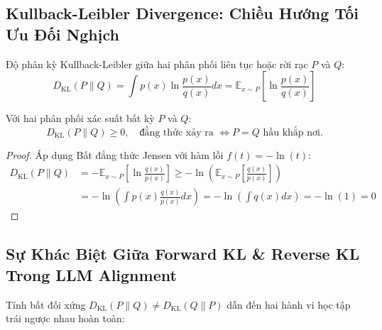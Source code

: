 \subsection{Kullback-Leibler Divergence: Chiều Hướng Tối Ưu Đối Nghịch}

Độ phân kỳ Kullback-Leibler giữa hai phân phối liên tục hoặc rời rạc $P$ và $Q$:
\begin{equation}
D_{\text{KL}}(P \parallel Q) = \int p(x) \ln \frac{p(x)}{q(x)} dx = \mathbb{E}_{x \sim P}\left[ \ln \frac{p(x)}{q(x)} \right]
\end{equation}

\begin{theorem}
Với hai phân phối xác suất bất kỳ $P$ và $Q$:
\begin{equation}
D_{\text{KL}}(P \parallel Q) \ge 0, \quad \text{đẳng thức xảy ra } \iff P = Q \text{ hầu khắp nơi.}
\end{equation}
\end{theorem}

\begin{proof}
Áp dụng Bất đẳng thức Jensen với hàm lồi $f(t) = - \ln(t)$:
\begin{align*}
D_{\text{KL}}(P \parallel Q) &= - \mathbb{E}_{x \sim P}\left[ \ln \frac{q(x)}{p(x)} \right] \ge - \ln \left( \mathbb{E}_{x \sim P}\left[ \frac{q(x)}{p(x)} \right] \right) \\
&= - \ln \left( \int p(x) \frac{q(x)}{p(x)} dx \right) = - \ln \left( \int q(x) dx \right) = - \ln(1) = 0
\end{align*}
\end{proof}

\subsection{Sự Khác Biệt Giữa Forward KL \& Reverse KL Trong LLM Alignment}

Tính bất đối xứng $D_{\text{KL}}(P \parallel Q) \neq D_{\text{KL}}(Q \parallel P)$ dẫn đến hai hành vi học tập trái ngược nhau hoàn toàn:

